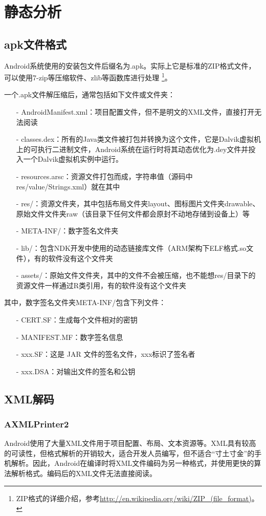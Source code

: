 \chapter{静态分析}
\section{apk文件格式}
Android系统使用的安装包文件后缀名为.apk。实际上它是标准的ZIP格式文件，可以使用7-zip等压缩软件、zlib等函数库进行处理
\footnote{ZIP格式的详细介绍，参考\url{http://en.wikipedia.org/wiki/ZIP\_(file\_format)}。}。

一个.apk文件解压缩后，通常包括如下文件或文件夹：
\begin{itemize}
	\item[-] AndroidManifest.xml：项目配置文件，但不是明文的XML文件，直接打开无法阅读
	\item[-] classes.dex：所有的Java类文件被打包并转换为这个文件，它是Dalvik虚拟机上的可执行二进制文件，Android系统在运行时将其动态优化为.dey文件并投入一个Dalvik虚拟机实例中运行。
	\item[-] resources.arsc：资源文件打包而成，字符串值（源码中res/value/Strings.xml）就在其中
	\item[-] res/：资源文件夹，其中包括布局文件夹layout、图标图片文件夹drawable、原始文件文件夹raw（该目录下任何文件都会原封不动地存储到设备上）等
	\item[-] META-INF/：数字签名文件夹
	\item[-] lib/：包含NDK开发中使用的动态链接库文件（ARM架构下ELF格式.so文件），有的软件没有这个文件夹
	\item[-] assets/：原始文件文件夹，其中的文件不会被压缩，也不能想res/目录下的资源文件一样通过R类引用，有的软件没有这个文件夹
\end{itemize}
其中，数字签名文件夹META-INF/包含下列文件：
\begin{itemize}
	\item[-] CERT.SF：生成每个文件相对的密钥
	\item[-] MANIFEST.MF：数字签名信息
	\item[-] xxx.SF：这是 JAR 文件的签名文件，xxx标识了签名者
	\item[-] xxx.DSA：对输出文件的签名和公钥
\end{itemize}

\section{XML解码}
\subsection{AXMLPrinter2}
Android使用了大量XML文件用于项目配置、布局、文本资源等。XML具有较高的可读性，但格式解析的开销较大，适合开发人员编写，但不适合“寸土寸金”的手机解析。因此，Android在编译时将XML文件编码为另一种格式，并使用更快的算法解析格式。编码后的XML文件无法直接阅读。

